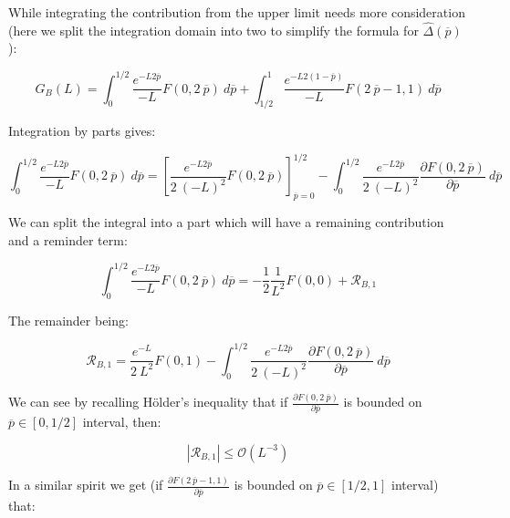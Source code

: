 \documentclass{article}
\theoremstyle{definition}
\begin{document}
While integrating the contribution from the upper limit needs more consideration (here we split the integration domain into two to simplify the formula for $\hat{\Delta}(\overline{p})$):

\begin{equation}
    G_B(L)
    =
    \int_0^{1/2} 
    \frac{e^{- L 2 \overline{p}}}{- L} 
    F(0, 2 \ \overline{p})
    \ d \overline{p} +
    \int_{1/2}^{1} 
    \frac{e^{- L 2 (1-\overline{p})}}{- L} 
    F(2 \ \overline{p} - 1, 1)
    \ d \overline{p}
\end{equation}

Integration by parts gives:

\begin{equation}
    \int_0^{1/2} 
    \frac{e^{- L 2 \overline{p}}}{- L} 
    F(0, 2 \ \overline{p})
    \ d \overline{p}
    =
    \left [
    \frac{e^{- L 2 \overline{p}}}{2 \ (- L)^2} 
    F(0, 2 \ \overline{p})
    \right ]_{\overline{p}=0}^{1/2}
    -
    \int_0^{1/2} 
    \frac{e^{- L 2 \overline{p}}}{2 \ (- L)^2} 
    \frac{\partial F(0, 2 \ \overline{p})}{\partial \overline{p}}
    \ d \overline{p}
\end{equation}

We can split the integral into a part which will have a remaining contribution and a reminder term:

\begin{equation}
    \int_0^{1/2} 
    \frac{e^{- L 2 \overline{p}}}{- L} 
    F(0, 2 \ \overline{p})
    \ d \overline{p}
    =
    -\frac{1}{2} \frac{1}{L^2} 
    F(0, 0) +
    \mathcal{R}_{B,1}
\end{equation}

The remainder being:

\begin{equation}
    \mathcal{R}_{B,1}
    =
    \frac{e^{- L }}{2 \ L^2} 
    F(0, 1) -
    \int_0^{1/2} 
    \frac{e^{- L 2 \overline{p}}}{2 \ (- L)^2} 
    \frac{\partial F(0, 2 \ \overline{p})}{\partial \overline{p}}
    \ d \overline{p}
\end{equation}

We can see by recalling Hölder's inequality that if $\frac{\partial F(0, 2 \ \overline{p})}{\partial \overline{p}}$ is bounded on $\overline{p} \in [0,1/2]$ interval, then:

\begin{equation}
    |\mathcal{R}_{B,1}|
    \le
    \mathcal{O}(L^{-3})
\end{equation}

In a similar spirit we get (if $\frac{\partial F(2 \ \overline{p} - 1,1)}{\partial \overline{p}}$ is bounded on $\overline{p} \in [1/2,1]$ interval) that:
\end{document}
